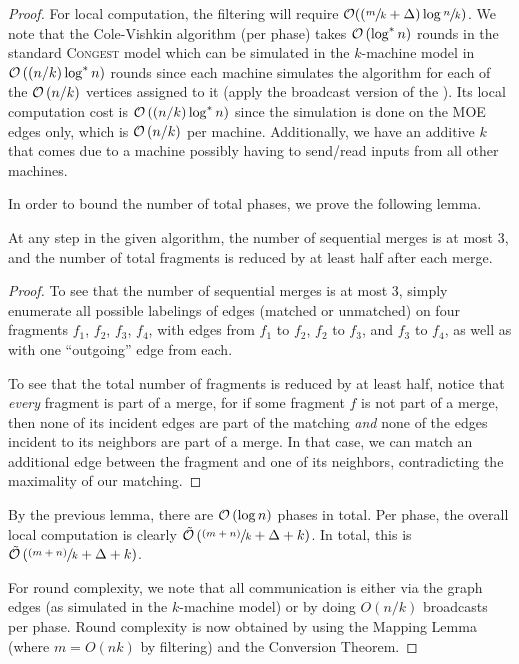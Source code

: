 \begin{proof}
    For local computation, the filtering will require $\mathcal{O}((\sfrac{m}{k}+\Delta)\log{\sfrac{n}{k}})$.
We note that the Cole-Vishkin algorithm (per phase) takes $\mathcal{O}\left(\log^*n\right)$ rounds
    in the standard \textsc{Congest} model which can be simulated in the $k$-machine model in $\mathcal{O}\left((n/k)\log^*n\right)$ rounds since each machine simulates the algorithm for each of
    the $\mathcal{O}\left(n/k\right)$ vertices assigned to it (apply the broadcast version of
    the ). Its local computation cost
    is $\mathcal{O}\left((n/k)\log^*n\right)$ since the simulation is done on the MOE edges only, which is $\mathcal{O}\left(n/k\right)$
    per machine. Additionally, we have an additive $k$ that comes due to a machine possibly having to send/read inputs from all other machines.

    In order to bound the number of total phases, we prove the following lemma.
    \begin{lemma}
        At any step in the given algorithm, the number of sequential merges is at most 3, and the number of total fragments is reduced by at least half after each merge.
    \end{lemma}

    \begin{proof}

        To see that the number of sequential merges is at most 3, simply enumerate all possible labelings of edges (matched or unmatched) on four fragments \(f_1\), \(f_2\), \(f_3\), \(f_4\), with edges from \(f_1\) to \(f_2\), \(f_2\) to \(f_3\), and \(f_3\) to \(f_4\), as well as with one ``outgoing'' edge from each.

        To see that the total number of fragments is reduced by at least half, notice that \emph{every} fragment is part of a merge, for if some fragment \(f\) is not part of a merge, then none of its incident edges are part of the matching \emph{and} none of the edges incident to its neighbors are part of a merge. In that case, we can match an additional edge between the fragment and one of its neighbors, contradicting the maximality of our matching.
    \end{proof}

    By the previous lemma, there are \(\mathcal{O}\left(\log{n}\right)\) phases in total. Per phase, the overall local computation is clearly $\tilde{\mathcal{O}}\left(\sfrac{(m + n)}{k}+\Delta + k\right)$. In total, this is $\tilde{\mathcal{O}}\left(\sfrac{(m+n)}{k}+\Delta + k\right)$.

    For round complexity, we note that all communication is either via the graph edges
    (as simulated in the $k$-machine model) or by doing $O(n/k)$ broadcasts per phase.
    Round complexity is now obtained by using the Mapping Lemma (where $m = O(nk)$ by filtering) and the Conversion Theorem.
\end{proof}